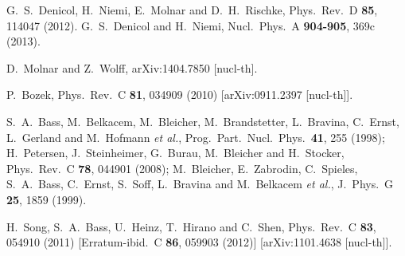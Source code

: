 \begin{thebibliography}{99}
  
  G.~S.~Denicol, H.~Niemi, E.~Molnar and D.~H.~Rischke,
  Phys.\ Rev.\ D {\bf 85}, 114047 (2012).
  G.~S.~Denicol and H.~Niemi,
  Nucl.\ Phys.\ A {\bf 904-905}, 369c (2013).
  
  D.~Molnar and Z.~Wolff,
  arXiv:1404.7850 [nucl-th].
  
  P.~Bozek,
  Phys.\ Rev.\ C {\bf 81}, 034909 (2010)
  [arXiv:0911.2397 [nucl-th]].
  
 S.~A.~Bass, M.~Belkacem, M.~Bleicher, M.~Brandstetter, L.~Bravina, C.~Ernst, L.~Gerland and M.~Hofmann {\it et al.},
  Prog.\ Part.\ Nucl.\ Phys.\  {\bf 41}, 255 (1998);  H.~Petersen, J.~Steinheimer, G.~Burau, M.~Bleicher and H.~Stocker,
  Phys.\ Rev.\ C {\bf 78}, 044901 (2008); M.~Bleicher, E.~Zabrodin, C.~Spieles, S.~A.~Bass, C.~Ernst, S.~Soff, L.~Bravina and M.~Belkacem {\it et al.},
  J.\ Phys.\ G {\bf 25}, 1859 (1999).
  
  
  H.~Song, S.~A.~Bass, U.~Heinz, T.~Hirano and C.~Shen,
  Phys.\ Rev.\ C {\bf 83}, 054910 (2011)
  [Erratum-ibid.\ C {\bf 86}, 059903 (2012)]
  [arXiv:1101.4638 [nucl-th]].
  

\end{thebibliography}
